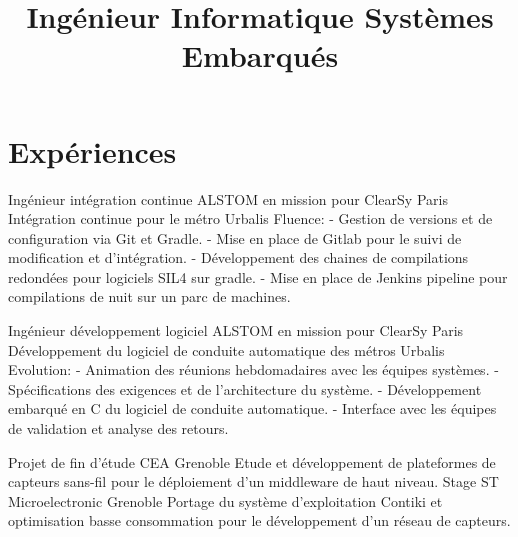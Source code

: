 \documentclass[10pt,a4paper]{moderncv}
\title{\large Ingénieur Informatique Systèmes Embarqués}
\begin{document}
\maketitle

\section{Expériences}

  {Ingénieur intégration continue}
  {ALSTOM en mission pour ClearSy}
  {}
  {Paris}
  {Intégration continue pour le métro Urbalis Fluence:\newline{}
  - Gestion de versions et de configuration via Git et Gradle.\newline{}
  - Mise en place de Gitlab pour le suivi de modification et d'intégration.\newline{}
  - Développement des chaines de compilations redondées pour logiciels SIL4 sur gradle.\newline{}
  - Mise en place de Jenkins pipeline pour compilations de nuit sur un parc de machines.\newline{}}

  {Ingénieur développement logiciel}
  {ALSTOM en mission pour ClearSy}
  {}
  {Paris}
  {Développement du logiciel de conduite automatique des métros Urbalis Evolution:\newline{}
  - Animation des réunions hebdomadaires avec les équipes systèmes.\newline{}
  - Spécifications des exigences et de l'architecture du système.\newline{}
  - Développement embarqué en C du logiciel de conduite automatique.\newline{}
  - Interface avec les équipes de validation et analyse des retours.\newline{}}

  {Projet de fin d'étude}
  {CEA}
  {}
  {Grenoble}
  {Etude et développement de plateformes de capteurs sans-fil pour le déploiement d'un middleware de haut niveau.\newline{}}
  {Stage}
  {ST Microelectronic}
  {}
  {Grenoble}
  {Portage du système d'exploitation Contiki et optimisation basse consommation pour le développement d'un réseau de capteurs.\newline{}}
  
\end{document}
